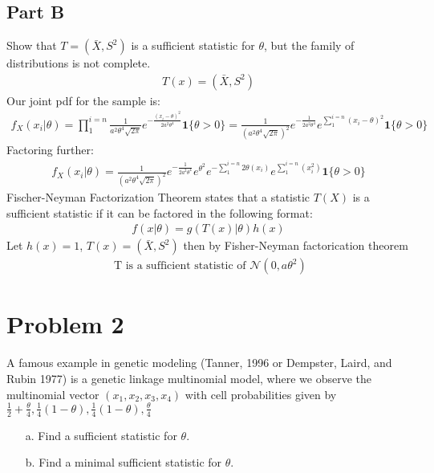 \documentclass{article}
\begin{document}
\subsection*{Part B}
Show that $T=(\bar{X}, S^2)$ is a sufficient statistic for $\theta$, but the family of distributions is not complete.
\begin{align*}
T(x) = (\bar{X},S^2)
\end{align*}
Our joint pdf for the sample is:
\begin{align*}
f_X(x_i|\theta) = \prod_{1}^{i=n} \frac{1}{a^2 \theta^4 \sqrt{2\pi}} e^{-\frac{(x_i-\theta)^2}{2 a^2 \theta^4}} \mathbf{1}\{ \theta > 0 \} = \frac{1}{(a^2 \theta^4 \sqrt{2\pi})^2} e^{-\frac{1}{2 a^2 \theta^4}} e^{\sum_{1}^{i=n}(x_i-\theta)^2} \mathbf{1}\{ \theta > 0 \}
\end{align*}
Factoring further:
\begin{align*}
f_X(x_i|\theta)= \frac{1}{(a^2 \theta^4 \sqrt{2\pi})^2} e^{-\frac{1}{2 a^2 \theta^4}} e^{\theta^2} e^{-\sum_{1}^{i=n} 2\theta(x_i)} e^{\sum_{1}^{i=n}(x_i^2)} \mathbf{1}\{ \theta > 0 \}
\end{align*}
Fischer-Neyman Factorization Theorem states that a statistic $T(X)$ is a sufficient statistic if it can be factored in the following format:
\begin{align*}
f(x|\theta) = g(T(x)|\theta)h(x)
\end{align*}
Let $h(x)=1$, $T(x) = (\bar{X}, S^2)$ then by Fisher-Neyman factorication theorem
\begin{align*}
\boxed{ \text{ T is a sufficient statistic of } \mathcal{N}(0,a\theta^2) }
\end{align*}

\clearpage

\section*{Problem 2}
A famous example in genetic modeling (Tanner, 1996 or Dempster, Laird, and Rubin 1977) is a genetic linkage multinomial model, where we observe the multinomial vector
$(x_1,x_2,x_3,x_4)$ with cell probabilities given by
$\frac{1}{2} + \frac{\theta}{4}, \frac{1}{4}(1 - \theta),\frac{1}{4}(1 - \theta),\frac{\theta}{4}$

\begin{enumerate}
\item[a.] Find a sufficient statistic for $\theta$.
\item[b.] Find a minimal sufficient statistic for $\theta$.
\end{enumerate}
\end{document}
